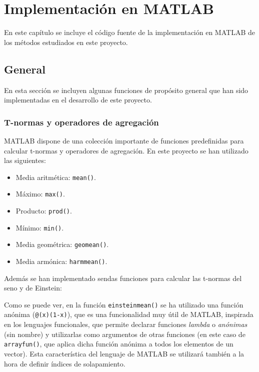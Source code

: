 \chapter{Implementación en MATLAB}
En este capítulo se incluye el código fuente de la implementación en MATLAB de los métodos estudiados en este proyecto.

\section{General}
En esta sección se incluyen algunas funciones de propósito general que han sido implementadas en el desarrollo de este proyecto.

\subsection{T-normas y operadores de agregación}
MATLAB dispone de una colección importante de funciones predefinidas para calcular t-normas y operadores de agregación. En este proyecto se han utilizado las siguientes:

\begin{itemize}
\item Media aritmética: \lstinline|mean()|.
\item Máximo: \lstinline|max()|.
\item Producto: \lstinline|prod()|.
\item Mínimo: \lstinline|min()|.
\item Media geométrica: \lstinline|geomean()|.
\item Media armónica: \lstinline|harmmean()|.
\end{itemize}

Además se han implementado sendas funciones para calcular las t-normas del seno y de Einstein:





Como se puede ver, en la función \lstinline|einsteinmean()| se ha utilizado una función anónima (\lstinline|@(x)(1-x)|), que es una funcionalidad muy útil de MATLAB, inspirada en los lenguajes funcionales, que permite declarar funciones \emph{lambda} o \emph{anónimas} (sin nombre) y utilizarlas como argumentos de otras funciones (en este caso de \lstinline|arrayfun()|, que aplica dicha función anónima a todos los elementos de un vector). Esta característica del lenguaje de MATLAB se utilizará también a la hora de definir índices de solapamiento.

